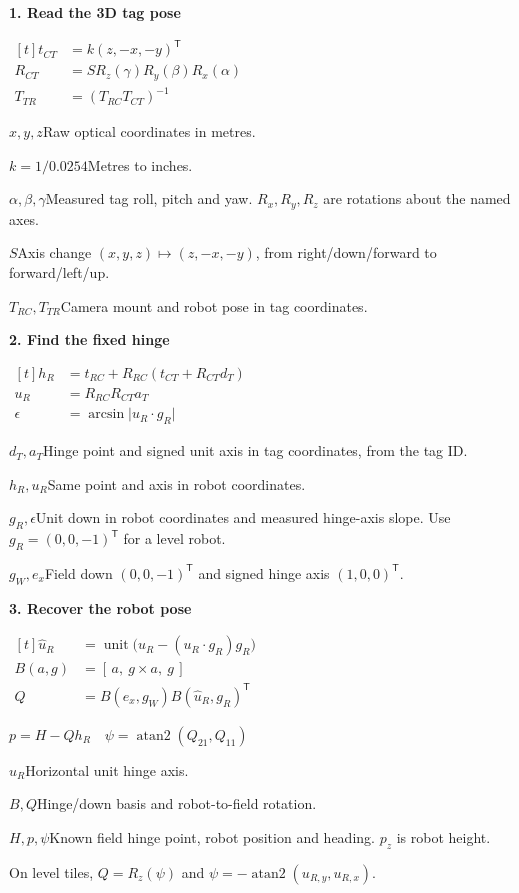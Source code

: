 \documentclass[10pt,border=0pt]{standalone}
\newlength{\panelwidth}
\DeclareMathOperator{\atanTwo}{atan2}
\DeclareMathOperator{\unit}{unit}
\newcommand{\vabs}[1]{\lvert #1\rvert}
\newcommand{\steptitle}[1]{{\fontsize{12}{14}\selectfont\bfseries #1\par}\vspace{1.5mm}}
\newcommand{\key}[2]{\noindent\(#1\)\enspace #2\par}
\newcommand{\rulegreen}{{\color{frog}\rule{\linewidth}{0.65pt}}\par}
\newcommand{\legendfont}{\fontsize{9}{11.4}\selectfont}
\begin{document}
{{\begin{minipage}{\panelwidth}
\begin{minipage}[t]{0.308\linewidth}
\raggedright
\steptitle{1. Read the 3D tag pose}
\(\begin{aligned}[t]
t_{CT}&=k(z,-x,-y)^{\mathsf T}\\
R_{CT}&=S R_z(\gamma) R_y(\beta) R_x(\alpha)\\
T_{TR}&=(T_{RC}T_{CT})^{-1}
\end{aligned}\)\par
\vspace{1.6mm}
\legendfont
\key{x,y,z}{Raw optical coordinates in metres.}
\key{k=1/0.0254}{Metres to inches.}
\key{\alpha,\beta,\gamma}{Measured tag roll, pitch and yaw. \(R_x,R_y,R_z\) are rotations about the named axes.}
\key{S}{Axis change \((x,y,z)\mapsto(z,-x,-y)\), from right/down/forward to forward/left/up.}
\key{T_{RC},T_{TR}}{Camera mount and robot pose in tag coordinates.}
\end{minipage}\hfill
%
\begin{minipage}[t]{0.307\linewidth}
\raggedright
\steptitle{2. Find the fixed hinge}
\(\begin{aligned}[t]
h_R&=t_{RC}+R_{RC}(t_{CT}+R_{CT}d_T)\\
u_R&=R_{RC}R_{CT}a_T\\
\epsilon&=\arcsin\vabs{u_R\cdot g_R}
\end{aligned}\)\par
\vspace{1.6mm}
\legendfont
\key{d_T,a_T}{Hinge point and signed unit axis in tag coordinates, from the tag ID.}
\key{h_R,u_R}{Same point and axis in robot coordinates.}
\key{g_R,\epsilon}{Unit down in robot coordinates and measured hinge-axis slope. Use \(g_R=(0,0,-1)^{\mathsf T}\) for a level robot.}
\key{g_W,e_x}{Field down \((0,0,-1)^{\mathsf T}\) and signed hinge axis \((1,0,0)^{\mathsf T}\).}
\end{minipage}\hfill
%
\begin{minipage}[t]{0.343\linewidth}
\raggedright
\steptitle{3. Recover the robot pose}
\(\begin{aligned}[t]
\hat u_R&=\unit\big(u_R-(u_R\cdot g_R)g_R\big)\\
B(a,g)&=[\,a,\ g\times a,\ g\,]\\
Q&=B(e_x,g_W) B(\hat u_R,g_R)^{\mathsf T}
\end{aligned}\)\par
\vspace{0.7mm}
\(\boxed{p=H-Qh_R}\quad \psi=\atanTwo(Q_{21},Q_{11})\)\par
\vspace{1.6mm}
\legendfont
\key{\hat u_R}{Horizontal unit hinge axis.}
\key{B,Q}{Hinge/down basis and robot-to-field rotation.}
\key{H,p,\psi}{Known field hinge point, robot position and heading. \(p_z\) is robot height.}
On level tiles, \(Q=R_z(\psi)\) and
\(\psi=-\atanTwo(u_{R,y},u_{R,x})\).\par
\end{minipage}\par
\vspace{1.5mm}\rulegreen\vspace{0.8mm}


\end{minipage}}}
\end{document}
